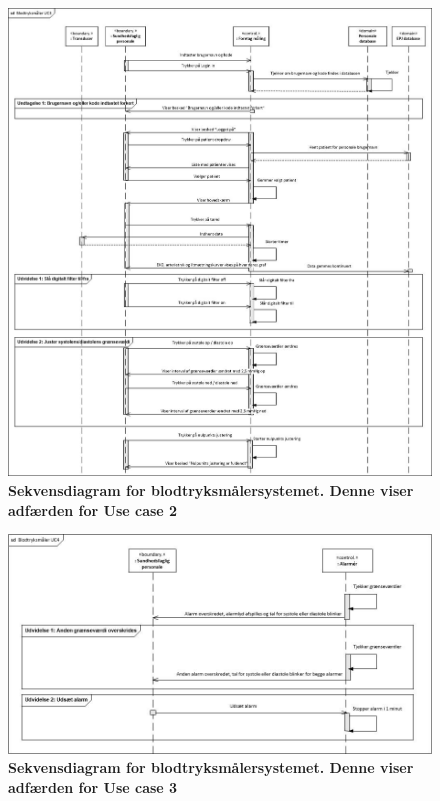 \begin{figure}[h!]
\includegraphics[width =1.0\textwidth , center]{billeder/sdUC2}
\caption{\textbf{Sekvensdiagram for blodtryksmålersystemet. Denne viser adfærden for Use case 2}}
\end{figure}

\begin{figure}[h!]
\includegraphics[width =1.0\textwidth , center]{billeder/sdUC3}
\caption{\textbf{Sekvensdiagram for blodtryksmålersystemet. Denne viser adfærden for Use case 3}}
\end{figure}

